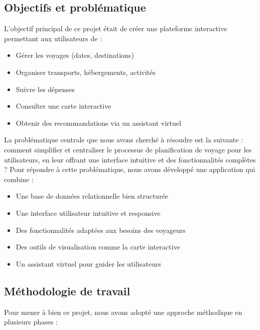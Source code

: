 \documentclass[a4paper,12pt]{article}
\begin{document}
\subsection{Objectifs et problématique}
L'objectif principal de ce projet était de créer une plateforme interactive permettant aux utilisateurs de :
\begin{itemize}
    \item Gérer les voyages (dates, destinations)
    \item Organiser transports, hébergements, activités
    \item Suivre les dépenses
    \item Consulter une carte interactive
    \item Obtenir des recommandations via un assistant virtuel
\end{itemize}


La problématique centrale que nous avons cherché à résoudre est la suivante : comment simplifier et centraliser le processus de planification de voyage pour les utilisateurs, en leur offrant une interface intuitive et des fonctionnalités complètes ? Pour répondre à cette problématique, nous avons développé une application qui
combine :
\begin{itemize}
 \item Une base de données relationnelle bien structurée 
 \item Une interface utilisateur intuitive et responsive 
\item Des fonctionnalités adaptées aux besoins des voyageurs 
\item Des outils de visualisation comme la carte interactive
\item Un assistant virtuel pour guider les utilisateurs
\end{itemize}

\subsection{Méthodologie de travail}

Pour mener à bien ce projet, nous avons adopté une approche méthodique en plusieurs phases :
\end{document}
